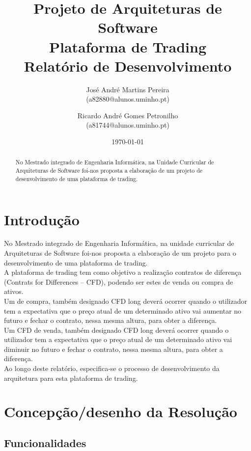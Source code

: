 \documentclass[11pt,a4paper]{report}%
\title{Projeto de Arquiteturas de Software\\
       \textbf{Plataforma de Trading}\\ Relatório de Desenvolvimento
       } %
\author{José André Martins Pereira\\ (a82880@alunos.uminho.pt) \and Ricardo André Gomes Petronilho\\ (a81744@alunos.uminho.pt)
       } %
\date{\today} %
\begin{document}
\maketitle %

\begin{abstract}  %
No Mestrado integrado de Engenharia Informática, na Unidade Curricular de Arquiteturas de Software foi-nos proposta a elaboração de um projeto de desenvolvimento de uma plataforma de trading.
\end{abstract}

\tableofcontents %

\chapter{Introdução} \label{chap:intro} %

No Mestrado integrado de Engenharia Informática, na unidade curricular de Arquiteturas de Software foi-nos proposta a elaboração de um projeto para o desenvolvimento de uma plataforma de trading.\\
A plataforma de trading tem como objetivo a realização contratos de diferença (Contrats for Differences – CFD), podendo ser estes de venda ou compra de ativos.\\
Um \textCFD de compra, também designado CFD long deverá ocorrer quando o utilizador tem a expectativa que o preço atual de um determinado ativo vai aumentar no futuro e  fechar o contrato, nessa mesma altura, para obter a diferença.\\
Um CFD de venda, também designado CFD long deverá ocorrer quando o utilizador tem a expectativa que o preço atual de um determinado ativo vai diminuir no futuro e  fechar o contrato, nessa mesma altura, para obter a diferença.\\
Ao longo deste relatório, especifica-se o processo de desenvolvimento da arquitetura para esta plataforma de trading.


\chapter{Concepção/desenho da Resolução}

\section{Funcionalidades}
\end{document}
